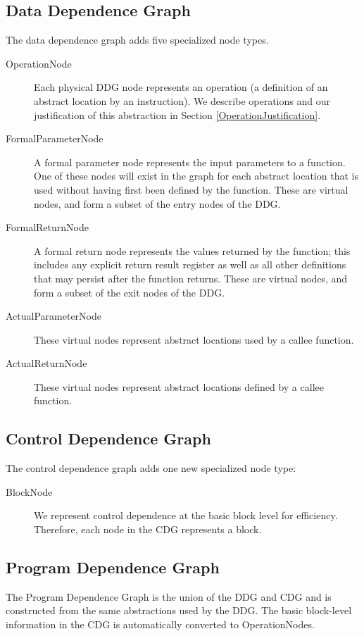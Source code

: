 \documentclass[12pt,titlepage]{article}
\begin{document}
\subsection{Data Dependence Graph}

The data dependence graph adds five specialized node types. 

\begin{description}
\item[OperationNode] Each physical DDG node represents an operation (a
definition of an abstract location by an instruction). We describe
operations and our justification of this abstraction in Section
\ref{OperationJustification}.
\item[FormalParameterNode] A formal parameter node represents the
  input parameters to a function. One of these nodes will exist in the
  graph for each abstract location that is used without having first
  been defined by the function. These are virtual nodes, and form a
  subset of the entry nodes of the DDG.
\item[FormalReturnNode] A formal return node represents the values
  returned by the function; this includes any explicit return result
  register as well as all other definitions that may persist after the
  function returns. These are virtual nodes, and form a subset of the
  exit nodes of the DDG.
\item[ActualParameterNode] These virtual nodes represent abstract
  locations used by a callee function.
\item[ActualReturnNode] These virtual nodes represent abstract
  locations defined by a callee function.
\end{description}

\subsection{Control Dependence Graph}

The control dependence graph adds one new specialized node type:

\begin{description}
\item[BlockNode] We represent
control dependence at the basic block level for efficiency. Therefore, each
node in the CDG represents a block. 
\end{description}

\subsection{Program Dependence Graph}
The Program Dependence Graph is the union of the DDG and CDG and is
constructed from the same abstractions used by the DDG. The basic
block-level information in the CDG is automatically converted to
OperationNodes.
\end{document}

